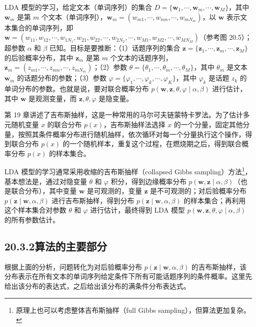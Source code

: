 \documentclass[UTF8,12pt,a4paper,fontset=fandol]{ctexart}
\begin{document}
LDA 模型的学习，给定文本（单词序列）的集合 $D=\{\mathbf{w}_1,\cdots,\mathbf{w}_m,\cdots,\mathbf{w}_M\}$，其中 $\mathbf{w}_m$ 是第 $m$ 个文本（单词序列），$\mathbf{w}_m=(w_{m1},\cdots,w_{mn},\cdots,w_{mN_m})$，以 $\mathbf{w}$ 表示文本集合的单词序列，即 $\mathbf{w}=(w_{11},w_{12},\cdots,w_{1N_1},w_{21},w_{22},\cdots,w_{2N_2},\cdots,w_{M1},w_{M2},\cdots,w_{MN_M})$（参考图 20.5）；超参数 $\alpha$ 和 $\beta$ 已知。目标是要推断：（1）话题序列的集合 $\mathbf{z}=\{\mathbf{z}_1,\cdots,\mathbf{z}_m,\cdots,\mathbf{z}_M\}$ 的后验概率分布，其中 $\mathbf{z}_m$ 是第 $m$ 个文本的话题序列，$\mathbf{z}_m=(z_{m1},\cdots,z_{mn},\cdots,z_{mN_m})$；（2）参数 $\theta=\{\theta_1,\cdots,\theta_m,\cdots,\theta_M\}$，其中 $\theta_m$ 是文本 $\mathbf{w}_m$ 的话题分布的参数；（3）参数 $\varphi=\{\varphi_1,\cdots,\varphi_k,\cdots,\varphi_K\}$，其中 $\varphi_k$ 是话题 $z_k$ 的单词分布的参数。也就是说，要对联合概率分布 $p(\mathbf{w},\mathbf{z},\theta,\varphi\mid\alpha,\beta)$ 进行估计，其中 $\mathbf{w}$ 是观测变量，而 $\mathbf{z},\theta,\varphi$ 是隐变量。

第 19 章讲述了吉布斯抽样，这是一种常用的马尔可夫链蒙特卡罗法。为了估计多元随机变量 $x$ 的联合分布 $p(x)$，吉布斯抽样法选择 $x$ 的一个分量，固定其他分量，按照其条件概率分布进行随机抽样，依次循环对每一个分量执行这个操作，得到联合分布 $p(x)$ 的一个随机样本，重复这个过程，在燃烧期之后，得到联合概率分布 $p(x)$ 的样本集合。

LDA 模型的学习通常采用收缩的吉布斯抽样（collapsed Gibbs sampling）方法\footnote{原理上也可以考虑整体吉布斯抽样（full Gibbs sampling），但算法更加复杂。}，基本想法是，通过对隐变量 $\theta$ 和 $\varphi$ 积分，得到边缘概率分布 $p(\mathbf{w},\mathbf{z}\mid\alpha,\beta)$（也是联合分布），其中变量 $\mathbf{w}$ 是可观测的，变量 $\mathbf{z}$ 是不可观测的；对后验概率分布 $p(\mathbf{z}\mid\mathbf{w},\alpha,\beta)$ 进行吉布斯抽样，得到分布 $p(\mathbf{z}\mid\mathbf{w},\alpha,\beta)$ 的样本集合；再利用这个样本集合对参数 $\theta$ 和 $\varphi$ 进行估计，最终得到 LDA 模型 $p(\mathbf{w},\mathbf{z},\theta,\varphi\mid\alpha,\beta)$ 的所有参数估计。

\subsection*{20.3.2\quad 算法的主要部分}

根据上面的分析，问题转化为对后验概率分布 $p(\mathbf{z}\mid\mathbf{w},\alpha,\beta)$ 的吉布斯抽样，该分布表示在所有文本的单词序列给定条件下所有可能话题序列的条件概率。这里先给出该分布的表达式，之后给出该分布的满条件分布表达式。
\end{document}
